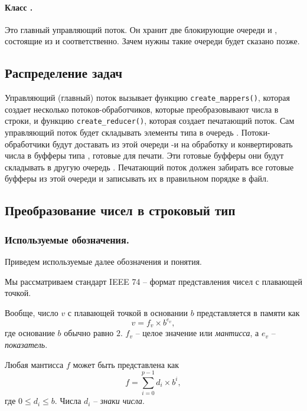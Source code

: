 \documentclass[specialist,subf,href,colorlinks=true,14pt
,times,mtpro,specialist
]{disser}
\begin{document}
\paragraph{Класс \texttt{}.}
Это главный управляющий поток.
Он хранит две блокирующие очереди \texttt{} и \texttt{}, состоящие из \texttt{} и \texttt{} соответственно. 
Зачем нужны такие очереди будет сказано позже.

\subsection{Распределение задач}
Управляющий (главный) поток \texttt{} вызывает функцию \texttt{create\_mappers()}, которая создает несколько потоков-обработчиков, которые преобразовывают числа в строки, и функцию \texttt{create\_reducer()}, которая создает печатающий поток.
Сам управляющий поток будет складывать элементы типа \texttt{} в очередь \texttt{}.
Потоки-обработчики будут доставать из этой очереди \texttt{}-и на обработку и конвертировать числа в буфферы типа \texttt{}, готовые для печати.
Эти готовые буфферы они будут складывать в другую очередь \texttt{}.
Печатающий поток должен забирать все готовые буфферы из этой очереди и записывать их в правильном порядке в файл.


\subsection{Преобразование чисел в строковый тип}
\subsubsection{Используемые обозначения.}
Приведем используемые далее обозначения и понятия.

Мы рассматриваем стандарт \textsf{IEEE 74} -- формат представления чисел с плавающей точкой.

Вообще, число $v$ с плавающей точкой в основании $b$ представляется в памяти как $$v = f_v \times b^{e_v},$$ где основание $b$ обычно равно $2$. $f_v$ -- целое значение или \textit{мантисса}, а $e_v$ -- \textit{показатель}.

Любая мантисса $f$ может быть представлена как $$f = \sum\limits_{i=0}^{p-1} d_i \times b^i,$$ где $0 \leqslant d_i \leqslant b$. 
Числа $d_i$ -- \textit{знаки числа}.
\end{document}
